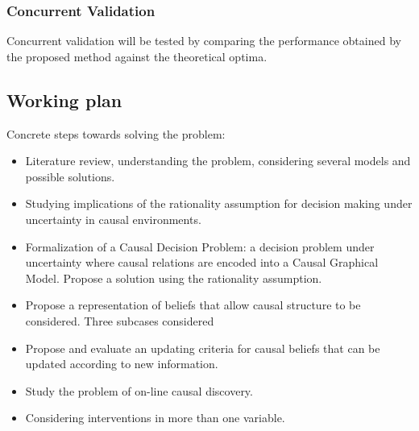 \documentclass[english,letterpaper,12pt,final]{article}
\theoremstyle{definition}
\begin{document}
\subsubsection{Concurrent Validation}
Concurrent validation will be tested by comparing the performance obtained by the proposed method against the theoretical optima.
\subsection{Working plan}
Concrete steps towards solving the problem:
\begin{itemize}
\item Literature review, understanding the problem, considering several models and possible solutions.
\item Studying implications of the rationality assumption for decision making under uncertainty in causal environments.
\item Formalization of a Causal Decision Problem: a decision problem under uncertainty where causal relations are encoded into a Causal Graphical Model. Propose a solution using the rationality assumption.
\item Propose a representation of beliefs that allow causal structure to be considered. Three subcases considered
\item Propose and evaluate an updating criteria for causal beliefs that can be updated according to new information.
\item Study the problem of on-line causal discovery.
\item Considering interventions in more than one variable.

\end{itemize}
\end{document}
